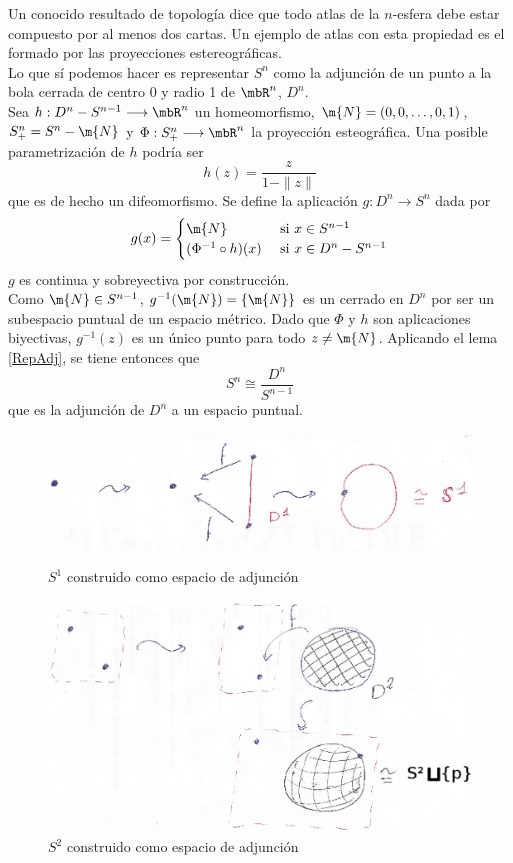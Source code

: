 \begin{ejem}\label{Sn_CW} Un conocido resultado de topología dice que todo atlas de la $n$-esfera debe estar compuesto por al menos dos cartas. Un ejemplo de atlas con esta propiedad es el formado por las proyecciones estereográficas.
\\

Lo que sí podemos hacer es representar $S^n$ como la adjunción de un punto a la bola cerrada de centro 0 y radio 1 de $\mbR^n$, $D^n$.
\\

Sea $h: D^n-S^{n-1} \longrightarrow \mbR^n$ un homeomorfismo, $\m{N}=(0,0,\dots,0,1)$, $S^n_+=S^n-\m{N}$ y $\Phi: S^n_+ \longrightarrow \mbR^n$ la proyección esteográfica. Una posible parametrización de $h$ podría ser $$h(z)=\frac{z}{1-\|z\|}$$ que es de hecho un difeomorfismo. Se define la aplicación $g: D^n \longrightarrow S^n$ dada por
$$g(x)=\begin{cases}
\m{N} &\mbox{ si }x \in S^{n-1}\\
(\Phi^{-1}\circ h)(x) &\mbox{ si }x \in D^n-S^{n-1}
\end{cases}$$ $g$ es continua y sobreyectiva por construcción.\\

Como $\m{N} \in S^{n-1}$, $g^{-1}(\m{N})=\{\m{N}\}$ es un cerrado en $D^n$ por ser un subespacio puntual de un espacio métrico. Dado que $\Phi$ y $h$ son aplicaciones biyectivas, $g^{-1}(z)$ es un único punto para todo $z\neq \m{N}$. Aplicando el lema \ref{RepAdj}, se tiene entonces que $$S^n\cong \frac{D^n}{S^{n-1}}$$ que es la adjunción de $D^n$ a un espacio puntual.

\begin{figure}[h]
\centering
\includegraphics[scale=0.8]{Figures/CWej1}
\caption{\label{CWej1}$S^1$ construido como espacio de adjunción}
\includegraphics[scale=0.75]{Figures/CWej4}
\caption{\label{CWej4}$S^2$ construido como espacio de adjunción}
\end{figure}
\end{ejem}

